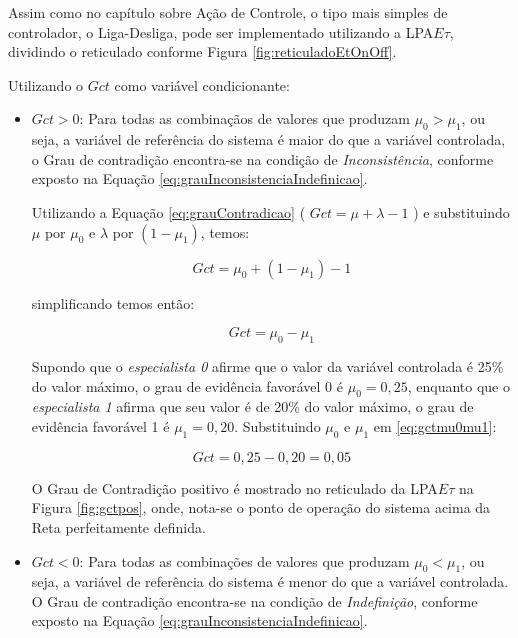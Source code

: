 Assim como no capítulo sobre Ação de Controle, 
o tipo mais simples de controlador, o Liga-Desliga,
pode ser implementado utilizando a 
LPA$E\tau$, 
dividindo o reticulado conforme 
Figura \ref{fig:reticuladoEtOnOff}.

Utilizando o $Gct$ como variável condicionante:

\begin{itemize}
\item $Gct > 0 $: 
Para todas as combinaçãos de valores que produzam 
$\mu_0 > \mu_1$, 
ou seja, a variável de referência do sistema é 
maior do que a variável controlada,
o Grau de contradição encontra-se na condição de 
\textit{Inconsistência}, conforme exposto na Equação 
\ref{eq:grauInconsistenciaIndefinicao}.

Utilizando a Equação \ref{eq:grauContradicao} 
( $Gct = \mu + \lambda - 1 $ ) e 
substituindo 
$\mu$ por $\mu_0$ e $\lambda$ por $(1-\mu_1)$, 
temos:

\begin{equation}
Gct = \mu_0 + (1-\mu_1) -1
\end{equation}

simplificando temos então:

\begin{equation}
Gct = \mu_0 - \mu_1
\label{eq:gctmu0mu1}
\end{equation}

Supondo que o \emph{especialista 0} afirme que 
o valor da variável controlada é 25\% do valor máximo, 
o grau de evidência favorável 0 é $\mu_0 = 0,25$, 
enquanto que o \emph{especialista 1} afirma que 
seu valor é de 20\% do valor máximo, 
o grau de evidência favorável 1 é $\mu_1 = 0,20$. 
Substituindo $\mu_0$ e $\mu_1$ em \ref{eq:gctmu0mu1}:

\begin{equation}
Gct = 0,25 - 0,20 = 0,05
\end{equation}

O Grau de Contradição positivo é mostrado no 
reticulado da LPA$E\tau$ na Figura \ref{fig:gctpos},
onde, nota-se o ponto de operação do sistema
acima da Reta perfeitamente definida.


\item $Gct < 0 $: 
Para todas as combinações de valores que produzam 
$\mu_0 < \mu_1$, 
ou seja, a variável de referência do sistema é 
menor do que a variável controlada. 
O Grau de contradição encontra-se na condição de 
\textit{Indefinição}, conforme exposto na Equação 
\ref{eq:grauInconsistenciaIndefinicao}.


\end{itemize}
